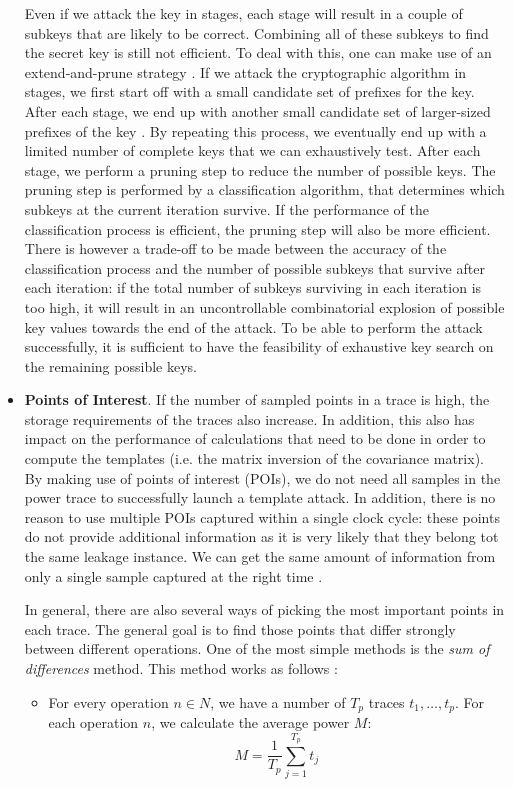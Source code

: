 \begin{itemize}
	Even if we attack the key in stages, each stage will result in a couple of subkeys that are likely to be correct. 
	Combining all of these subkeys to find the secret key is still not efficient.
	To deal with this, one can make use of an extend-and-prune strategy \cite{chari2002template}.
	If we attack the cryptographic algorithm in stages, we first start off with a small candidate set of prefixes for the key.
	After each stage, we end up with another small candidate set of larger-sized prefixes of the key \cite{rohatgi2009improved}.
	By repeating this process, we eventually end up with a limited number of complete keys that we can exhaustively test.
	After each stage, we perform a pruning step to reduce the number of possible keys.
	The pruning step is performed by a classification algorithm, that determines which subkeys at the current iteration survive.
	If the performance of the classification process is efficient, the pruning step will also be more efficient.
	There is however a trade-off to be made between the accuracy of the classification process and the number of possible subkeys that survive after each iteration: if the total number of subkeys surviving in each iteration is too high, it will result in an uncontrollable combinatorial explosion of possible key values towards the end of the attack.
	To be able to perform the attack successfully, it is sufficient to have the feasibility of exhaustive key search on the remaining possible keys. 

	\item \textbf{Points of Interest}. If the number of sampled points in a trace is high, the storage requirements of the traces also increase. 
	In addition, this also has impact on the performance of calculations that need to be done in order to compute the templates (i.e. the matrix inversion of the covariance matrix).
	By making use of points of interest (POIs), we do not need all samples in the power trace to successfully launch a template attack.
	In addition, there is no reason to use multiple POIs captured within a single clock cycle: these points do not provide additional information as it is very likely that they belong tot the same leakage instance.
	We can get the same amount of information from only a single sample captured at the right time \cite{whisperer2018template, rechberger2004practical}.
	
	In general, there are also several ways of picking the most important points in each trace.
	The general goal is to find those points that differ strongly between different operations.
	One of the most simple methods is the \emph{sum of differences} method.
	This method works as follows \cite{whisperer2018template, rechberger2004practical}: 
	\begin{itemize}
		\item For every operation $n \in N$, we have a number of $T_p$ traces $t_1, \ldots, t_p$.
		For each operation $n$, we calculate the average power $M$:
		\begin{equation*}
		M = \frac{1}{T_p} \sum_{j = 1}^{T_p} t_j
		\end{equation*}
		

\end{itemize}
\end{itemize}
